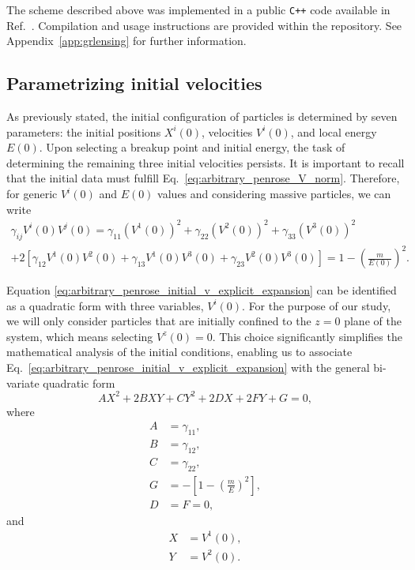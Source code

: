 The scheme described above was implemented in a public \texttt{C++} code available in Ref.~\cite{GRLensingRepo}. Compilation and usage instructions are provided within the repository. See Appendix~\ref{app:grlensing} for further information.

\subsection{Parametrizing initial velocities}

As previously stated, the initial configuration of particles is determined by seven parameters: the initial positions $X^i(0)$, velocities $V^i(0)$, and local energy $E(0)$. Upon selecting a breakup point and initial energy, the task of determining the remaining three initial velocities persists. It is important to recall that the initial data must fulfill Eq.~\eqref{eq:arbitrary_penrose_V_norm}. Therefore, for generic $V^i(0)$ and $E(0)$ values and considering massive particles, we can write
%
\begin{multline}
  \gamma_{ij} V^{i}(0)V^{j}(0) = \gamma_{11}\left(V^1(0)\right)^2 + \gamma_{22}\left(V^2(0)\right)^2 + \gamma_{33}\left(V^3(0)\right)^2 \\
  + 2\left[ \gamma_{12}V^1(0)V^2(0) + \gamma_{13}V^1(0)V^3(0) + \gamma_{23}V^2(0)V^3(0) \right] = 1-\left(\frac{m}{E(0)}\right)^2.
  \label{eq:arbitrary_penrose_initial_v_explicit_expansion}
\end{multline}

Equation \eqref{eq:arbitrary_penrose_initial_v_explicit_expansion} can be identified as a quadratic form with three variables, $V^i(0)$. For the purpose of our study, we will only consider particles that are initially confined to the $z=0$ plane of the system, which means selecting $V^z(0) = 0$. This choice significantly simplifies the mathematical analysis of the initial conditions, enabling us to associate Eq.~\eqref{eq:arbitrary_penrose_initial_v_explicit_expansion} with the general bi-variate quadratic form
%
\begin{equation}
  A X^2 + 2 B X Y + C Y^2 + 2 D X + 2 F Y + G = 0,
  \label{eq:arbitrary_penrose_general_quadratic_form}
\end{equation}
%
where
%
\begin{align}
  A & = \gamma_{11},                                      \\
  B & = \gamma_{12},                                      \\
  C & = \gamma_{22},                                      \\
  G & = -\left[ 1 - \left( \frac{m}{E} \right)^2 \right], \\
  D & = F = 0,
\end{align}
%
and
%
\begin{align}
  X & = V^1(0),  \\
  Y & = V^2(0).
\end{align}


